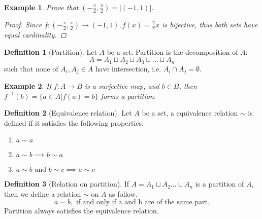 \documentclass{article}
\theoremstyle{MyNonumberplain}
\theoremstyle{break}
\newtheorem*{proof}{Proof. }
\theoremstyle{break}
\newtheorem{example}{Example}[section]
\theoremstyle{break}
\theoremstyle{definition}
\theoremstyle{break}
\newtheorem{definition}{Definition}[section]
\begin{document}
\begin{expbox}
    \begin{example}
        Prove that $(-\frac{\pi}{2},\frac{\pi}{2})=|(-1,1)|$.

\begin{prfbox}
    \begin{proof}
        Since $f:(-\frac{\pi}{2},\frac{\pi}{2})\to(-1,1),f(x)=\frac{2}{\pi}x$ is bijective, thus both sets have equal cardinality.
    \end{proof}
\end{prfbox}

    \end{example}
\end{expbox}
\begin{defbox}
    \begin{definition}[Partition]
        Let $A$ be a set. Partition is the decomposition of $A$:
            $$A=A_1\sqcup A_2 \sqcup A_3 \sqcup ... \sqcup A_n$$
        such that none of $A_i,A_j\in A$ have intersection, i.e. $A_i\cap A_j=\emptyset$.
    \end{definition}  
\end{defbox}

\begin{expbox}
    \begin{example}
        If $f : A \to B$ is a surjective map, and $b \in B$, then $f^{- 1} (b) = \{ a \in A|f (a) = b \}$ forms a partition.
    \end{example}
\end{expbox}

\begin{defbox}
    \begin{definition}[Equivalence relation]
        Let $A$ be a set, a equivalence relation $\sim$ is defined if it satisfies the following properties:
        \begin{enumerate}
            \item $a \sim a$ \bigskip
            \item $a \sim b \implies b \sim a$\bigskip
            \item $a \sim b \text{ and } b \sim c \implies a \sim c$
        \end{enumerate}
    \end{definition}
\end{defbox}

\begin{defbox}
    \begin{definition}[Relation on partition]
        If $A = A_1 \sqcup A_2 \ldots \sqcup A_n$ is a partition of $A$, then we define a
        relation $\sim$ on $A$ as follow.
        \[ a \sim b, \text{ if and only if a and b are of the same part.} \]
        Partition always satisfies the equivalence relation.
    \end{definition}
\end{defbox}
\end{document}

